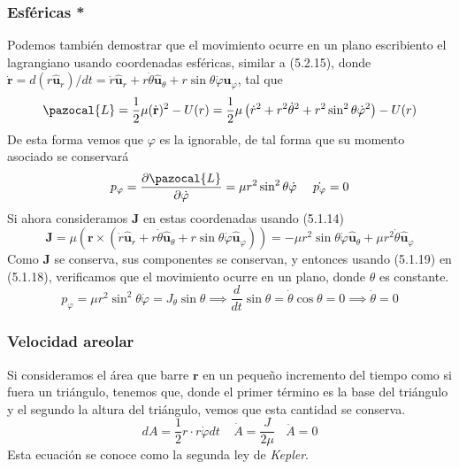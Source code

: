 \subsubsection{Esféricas *}
Podemos también demostrar que el movimiento ocurre en un plano escribiento el lagrangiano usando coordenadas esféricas, similar a (5.2.15), donde $\dot{\mathbf{r}}=d{(r \hat{\mathbf{u}}_r)}/dt=\dot{r}\hat{\mathbf{u}}_r + r \dot{\theta }\hat{\mathbf{u}}_\theta + r\sin \theta \dot{\varphi} \hat{\mathbf{u}}_\varphi$, tal que 
\begin{equation} \label{5.1.17}
    \pazocal{L} = \frac{1}{2}\mu(\dot{\mathbf{r}})^2-U(r) = \frac{1}{2}\mu\left(\dot{r}^2+r^2\dot{\theta}^2 + r^2 \sin^2 \theta \dot{\varphi}^2\right)-U(r)
\end{equation} 
De esta forma vemos que $\varphi$ es la ignorable, de tal forma que su momento asociado se conservará
\begin{equation} \label{5.1.18}
    p_\varphi = \frac{\partial \pazocal{L}}{\partial \dot{\varphi}} = \mu r^2 \sin^2 \theta \dot{\varphi} \ \ \ \  \dot{p_\varphi} = 0
\end{equation} 
Si ahora consideramos $\mathbf{J}$ en estas coordenadas usando (5.1.14)
\begin{equation} \label{5.1.19}
    \mathbf{J} = \mu (\mathbf{r} \times (\dot{r}\hat{\mathbf{u}}_r + r \dot{\theta}\hat{\mathbf{u}}_\theta + r\sin \theta \dot{\varphi} \hat{\mathbf{u}}_\varphi))=-\mu r^2 \sin \theta \dot{\varphi} \hat{\mathbf{u}}_\theta + \mu r^2 \dot{\theta}\hat{\mathbf{u}}_\varphi
\end{equation} 
Como $\mathbf{J}$ se conserva, sus componentes se conservan, y entonces usando (5.1.19) en (5.1.18), verificamos que el movimiento ocurre en un plano, donde $\theta$ es constante.
\begin{equation} \label{5.1.20}
    p_\varphi = \mu r^2 \sin^2 \theta \dot{\varphi} = J_\theta \sin\theta \implies \frac{d}{dt} \sin\theta = \dot{\theta} \cos \theta = 0 \implies \dot{\theta} = 0
\end{equation} 
\vspace{-30pt}
\subsubsection{Velocidad areolar}
Si consideramos el área que barre $\mathbf{r}$ en un pequeño incremento del tiempo como si fuera un triángulo, tenemos que, donde el primer término es la base del triángulo y el segundo la altura del triángulo, vemos que esta cantidad se conserva.
\begin{equation} \label{5.1.21}
    dA = \frac{1}{2} r\cdot r\dot{\varphi} dt \ \ \ \ \ \dot{A} = \frac{J}{2\mu} \ \ \ \ \ddot{A} = 0
\end{equation} 
Esta ecuación se conoce como la segunda ley de \textit{Kepler}.
